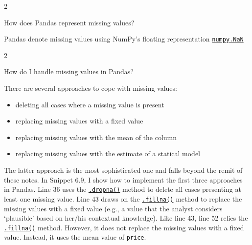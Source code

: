 \documentclass[a4paper,11pt]{book}
\newcommand{\question}[1]{%
    \begin{tcolorbox}[colback=comp_c!10,colframe=comp_c,sidebyside align=top,width=\linewidth,before skip=1ex]
        #1
    \end{tcolorbox}
    \switchcolumn%
}
\newcommand{\note}[1]{%
    \begin{tcolorbox}[colback=white!0,colframe=white!10,width=\linewidth,before skip=1ex]
        #1
    \end{tcolorbox}
}
\begin{document}
\begin{paracol}{2}
	\question{\raggedright How does Pandas represent missing values?}
	\note{Pandas denote missing values using NumPy's floating representation \href{https://numpy.org/doc/stable/reference/constants.html?highlight=nan\#numpy.NaN}{\texttt{numpy.NaN}}
	}
\end{paracol}
\clearpage

\begin{paracol}{2}
	\question{\raggedright How do I handle missing values in Pandas?}
	\note{There are several approaches to cope with missing values:
	\begin{itemize}
		\item deleting all cases where a missing value is present
		\item replacing missing values with a fixed value
		\item replacing missing values with the mean of the column
		\item replacing missing values with the estimate of a statical model
	\end{itemize}
	
	\quad The latter approach is the most sophisticated one and falls beyond the remit of these notes. In Snippet 6.9, I show how to implement the first three approaches in Pandas. Line 36 uses the \href{https://pandas.pydata.org/docs/reference/api/pandas.DataFrame.dropna.html?highlight=dropna}{\texttt{.dropna()}} method to delete all cases presenting at least one missing value. Line 43 draws on the \href{https://pandas.pydata.org/docs/reference/api/pandas.DataFrame.fillna.html?highlight=fillna\#pandas.DataFrame.fillna}{\texttt{.fillna()}} method to replace the missing values with a fixed value (e.g., a value that the analyst considers `plausible' based on her/his contextual knowledge). Like line 43, line 52 relies the \href{https://pandas.pydata.org/docs/reference/api/pandas.DataFrame.fillna.html?highlight=fillna\#pandas.DataFrame.fillna}{\texttt{.fillna()}} method. However, it does not replace the missing values with a fixed value. Instead, it uses the mean value of \texttt{price}.
	} 
\end{paracol}
\end{document}
